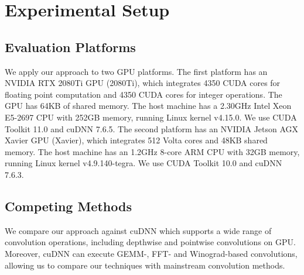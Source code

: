 

\section{Experimental Setup}

\subsection{Evaluation Platforms} We apply our approach to two GPU platforms.
The first platform has an NVIDIA RTX 2080Ti GPU (2080Ti), which integrates 4350 CUDA cores for floating point computation and 4350 CUDA
cores for integer operations. The GPU has 64KB of shared memory. The host machine has a 2.30GHz Intel Xeon E5-2697 CPU with 252GB memory,
running Linux kernel v4.15.0. We use CUDA Toolkit 11.0 and cuDNN 7.6.5. The second platform has an NVIDIA Jetson AGX Xavier GPU (Xavier),
which integrates 512 Volta cores and 48KB shared memory. The host machine has an 1.2GHz 8-core ARM CPU with 32GB memory, running Linux
kernel v4.9.140-tegra. We use CUDA Toolkit 10.0 and cuDNN 7.6.3.


\subsection{Competing Methods} We compare our approach against cuDNN \cite{ChetlurWVCTCS14} which supports a wide range of convolution operations,
 including depthwise and pointwise convolutions on GPU.  Moreover, cuDNN can execute GEMM-, FFT- and Winograd-based convolutions, allowing
 us to compare our techniques with mainstream convolution methods.


%
%


